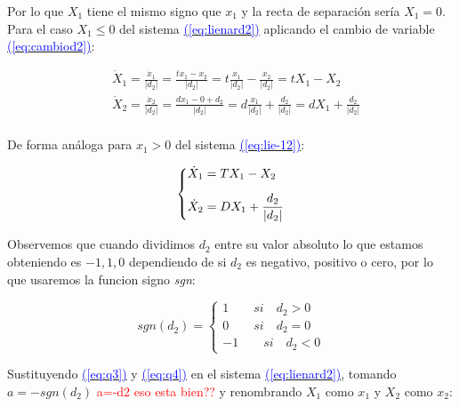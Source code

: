 \documentclass[12pt,a4paper]{report} %
\newcommand{\eref}[1]{\hyperref[#1]{\textcolor{blue}{(\ref*{#1})}}}
\newcommand{\eref}[1]{\hyperref[#1]{\textcolor{blue}{\textit{(\ref*{#1})}}}}
\begin{document}
	\noindent Por lo que $X_1$ tiene el mismo signo que $x_1$ y la recta de separación sería $X_1=0$.\\[0.5cm]
	Para el caso $X_1\leq 0$ del sistema \eref{eq:lienard2} aplicando el cambio de variable \eref{eq:cambiod2}:
	
	\begin{equation}
		\label{eq:q3}
		\begin{aligned}
			&\dot{X}_1=\frac{\dot{x}_1}{|d_2|}=\frac{tx_1-x_2}{|d_2|}=t\frac{x_1}{|d_2|}-\frac{x_2}{|d_2|}=tX_1-X_2\\[2mm]
			&\dot{X}_2=\frac{\dot{x}_2}{|d_2|}=\frac{dx_1-0+d_2}{|d_2|}=d\frac{x_1}{|d_2|}+\frac{d_2}{|d_2|}=dX_1+\frac{d_2}{|d_2|}\\[2mm]
		\end{aligned}
	\end{equation}\smallskip
	
	\noindent De forma análoga para $x_1>0$ del sistema \eref{eq:lie-12}:
	
	\begin{equation}
		\label{eq:q4}
		\scalebox{1}{$\displaystyle
			\left\{
			\begin{aligned}
				&\dot{X}_1=TX_1-X_2 \\[2mm]
				&\dot{X}_2=DX_1+\frac{d_2}{|d_2|}
			\end{aligned}
			\right.
			$}
	\end{equation}\smallskip
	
	\noindent Observemos que cuando dividimos $d_2$ entre su valor absoluto lo que estamos obteniendo es $-1,1,0$ dependiendo de si $d_2$ es negativo, positivo o cero, por lo que usaremos la funcion signo \textit{sgn}:
	
	\begin{equation}
		\label{eq:sgn}
		sgn(d_2)=\left\{
		\begin{aligned}
		1 \qquad si  \quad d_2>0 \\
		0 \qquad si  \quad d_2=0 \\
		-1 \qquad si \quad d_2<0 
    	\end{aligned}
		\right.
	\end{equation}\smallskip
	
	\noindent Sustituyendo \eref{eq:q3} y \eref{eq:q4} en el sistema \eref{eq:lienard2}, tomando $a=-sgn(d_2)$ \textcolor{red}{a=-d2 eso esta bien??} y renombrando $X_1$ como $x_1$ y $X_2$ como $x_2$:
	
\end{document}
